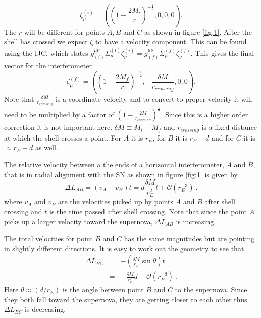 \documentclass[aps,showpacs,twocolumn,floats,prd,superscriptaddress,nofootinbib]{revtex4-1}
\begin{document}
\begin{equation}
	\zeta_\mu^{(i)} = \left( \left( 1 - \frac{2M_i}{r} \right)^{-\frac{1}{2}}, 0, 0, 0 \right).
\end{equation}
The $r$ will be different for points $A,B$ and $C$ as shown in figure \ref{fig:1}. After the shell has crossed we expect $\zeta$ to have a velocity component. This can be found using the IJC, which states $g^{\mu \nu}_{(i)} \Sigma_\mu^{(i)} \zeta^{(i)}_\nu = g^{\mu \nu}_{(f)} \Sigma_\mu^{(f)} \zeta^{(f)}_\nu$. This gives the final vector for the interferometer
\begin{equation}
	\zeta_\mu^{(f)} = \left( \left( 1 - \frac{2M_f}{r} \right)^{-\frac{1}{2}}, - \frac{\delta M}{r_{crossing}}, 0, 0 \right).
\end{equation}
Note that $\frac{\delta M}{r_{corssing}}$ is a coordinate velocity and to convert to proper velocity it will need to be multiplied by a factor of $\left( 1 - \frac{2M}{r_{corrsing}} \right)^\frac{1}{2}$. Since this is a higher order correction it is not important here. $\delta M \equiv M_i - M_f$ and $r_{crossing}$ is a fixed distance at which the shell crosses a point. For $A$ it is $r_E$, for $B$ it is $r_E + d$ and for $C$ it is $\approx r_E + d$ as well.

 The relative velocity between a the ends of a horizontal interferometer, $A$ and $B$, that is in radial alignment with the SN as shown in figure \ref{fig:1} is given by
\begin{equation}
	\Delta L_{AB} =  (v_A - v_B)t = d \frac{\delta M}{r_E^2}  t+ \mathcal{O}(r_E^{-3})~.
\end{equation}
where $v_A$ and $v_B$ are the velocities picked up by points $A$ and $B$ after shell crossing and $t$ is the time passed after shell crossing. Note that since the point $A$ picks up a larger velocity toward the supernova, $\Delta L_{AB}$ is increasing.

The total velocities for point $B$ and $C$ has the same magnitudes but are pointing in slightly different directions. It is easy to work out the geometry to see that
\begin{eqnarray}
	\Delta L_{BC} &=& -\left( \frac{ \delta M}{r_E} \sin \theta \right) t 
	\\ \nonumber
	&=& - \frac{\delta M}{r_E^2} d + \mathcal{O}(r_E^{-3})~.
\end{eqnarray}
Here $\theta\approx (d/r_E)$ is the angle between point $B$ and $C$ to the supernova. Since they both fall toward the supernova, they are getting closer to each other thus $\Delta L_{BC}$ is decreasing.
\end{document}
